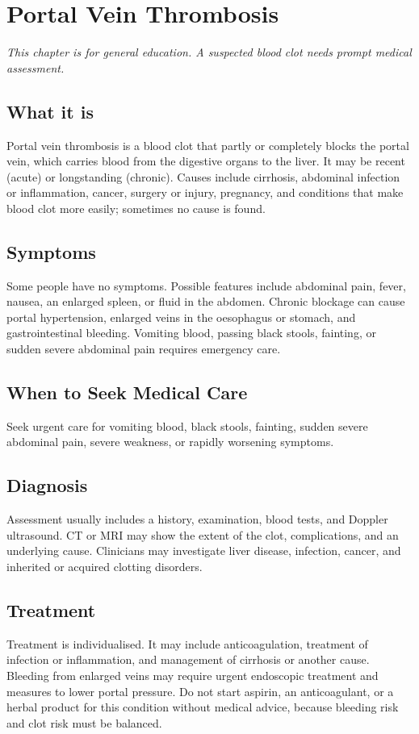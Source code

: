 \chapter{Portal Vein Thrombosis}

\medskip
\noindent\textit{This chapter is for general education. A suspected blood clot needs prompt medical assessment.}

\section*{What it is}
Portal vein thrombosis is a blood clot that partly or completely blocks the portal vein, which carries blood from the digestive organs to the liver. It may be recent (acute) or longstanding (chronic). Causes include cirrhosis, abdominal infection or inflammation, cancer, surgery or injury, pregnancy, and conditions that make blood clot more easily; sometimes no cause is found.

\section*{Symptoms}
Some people have no symptoms. Possible features include abdominal pain, fever, nausea, an enlarged spleen, or fluid in the abdomen. Chronic blockage can cause portal hypertension, enlarged veins in the oesophagus or stomach, and gastrointestinal bleeding. Vomiting blood, passing black stools, fainting, or sudden severe abdominal pain requires emergency care.

\section*{When to Seek Medical Care}
Seek urgent care for vomiting blood, black stools, fainting, sudden severe abdominal pain, severe weakness, or rapidly worsening symptoms.

\section*{Diagnosis}
Assessment usually includes a history, examination, blood tests, and Doppler ultrasound. CT or MRI may show the extent of the clot, complications, and an underlying cause. Clinicians may investigate liver disease, infection, cancer, and inherited or acquired clotting disorders.

\section*{Treatment}
Treatment is individualised. It may include anticoagulation, treatment of infection or inflammation, and management of cirrhosis or another cause. Bleeding from enlarged veins may require urgent endoscopic treatment and measures to lower portal pressure. Do not start aspirin, an anticoagulant, or a herbal product for this condition without medical advice, because bleeding risk and clot risk must be balanced.

